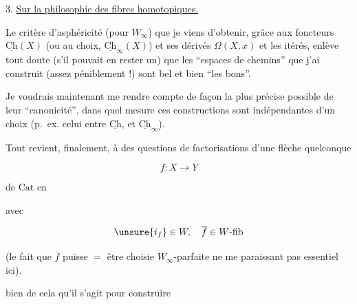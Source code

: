 
3. \uline{Sur la philosophie des fibres homotopiques.}

 Le critère d'asphéricité (pour $W_\infty$) que je viens d'obtenir, grâce aux foncteurs $\underline{\mathrm{Ch}}(X)$ (ou au choix, $\underline{\mathrm{Ch}}_\infty(X)$) et ses dérivés $\Omega(X,x)$ et les itérés, enlève tout doute (s'il pouvait en rester un) que les  ``espaces de chemins'' que j'ai construit (assez péniblement !) sont bel et bien ``les bons''.

Je voudrais maintenant me rendre compte de façon la plus précise possible  de leur ``canonicité'', dans quel mesure ces constructions sont indépendantes d'un choix (p.~ex. celui entre   $\underline{\mathrm{Ch}}$, et $\underline{\mathrm{Ch}}_\infty$).

Tout revient, finalement, à des questions de factorisations d'une flèche quelconque

\[
f:X\longrightarrow Y
\]

de $\mathrm{Cat}$ en


avec

\[
\unsure{i_f}\in W,\quad \overline f\in W\text{-}\mathrm{fib}
\]

(le fait que $\overline f$ puisse $=$ être choisie $W_\infty$-parfaite ne me paraissant pas essentiel ici).

 bien de cela qu'il s'agit pour construire
